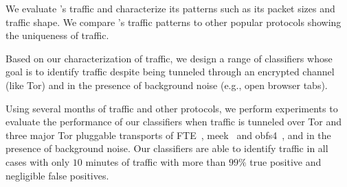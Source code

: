 \begin{compactenum}
	\item We evaluate \bc's traffic and characterize its patterns such as its packet sizes and traffic shape. We compare \bc's traffic patterns to other popular protocols showing the uniqueness of \bc traffic. 
	\item Based on our characterization of \bc traffic, we design a range of classifiers whose goal is to identify \bc traffic despite being tunneled through an encrypted channel (like Tor) and in the presence of background noise (e.g., open browser tabs). 
	\item Using several months of \bc traffic and other protocols, we perform experiments to evaluate the performance of our classifiers when \bc traffic is tunneled over Tor and three major Tor pluggable transports of FTE~\cite{fte}, meek~\cite{meek} and obfs4~\cite{obfsproxy}, and in the presence of background noise. Our classifiers are able to identify \bc traffic in all cases with only $10$ minutes of traffic with more than $99\%$ true positive and negligible false positives.
	
\end{compactenum}


\begin{comment}
 \section{Characterizing Bitcoin Traffic}
In this section, we demonstrate the unique features of \bc traffic. We show that such unique traffic patterns of \bc make it reliably distinguishable from other protocols even despite encryption and mixture with background traffic. 
We will use our characterization to design classifiers for \bc in the following sections. For the sake of space, we moved this section to the Appendix~\ref{sec:charachterzing_bc}
\end{comment}